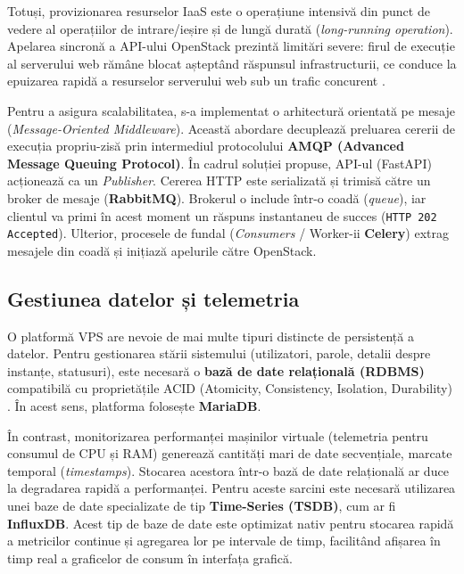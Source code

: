 Totuși, provizionarea resurselor IaaS este o operațiune intensivă din punct de vedere al operațiilor de intrare/ieșire și de lungă durată (\textit{long-running operation}). Apelarea sincronă a API-ului OpenStack prezintă limitări severe: firul de execuție al serverului web rămâne blocat așteptând răspunsul infrastructurii, ce conduce la epuizarea rapidă a resurselor serverului web sub un trafic concurent \cite{hohpe2004enterprise}.

Pentru a asigura scalabilitatea, s-a implementat o arhitectură orientată pe mesaje (\textit{Message-Oriented Middleware}). Această abordare decuplează preluarea cererii de execuția propriu-zisă prin intermediul protocolului \textbf{AMQP (Advanced Message Queuing Protocol)}. În cadrul soluției propuse, API-ul (FastAPI) acționează ca un \textit{Publisher}. Cererea HTTP este serializată și trimisă către un broker de mesaje (\textbf{RabbitMQ}). Brokerul o include într-o coadă (\textit{queue}), iar clientul va primi în acest moment un răspuns instantaneu de succes (\texttt{HTTP 202 Accepted}). Ulterior, procesele de fundal (\textit{Consumers} / Worker-ii \textbf{Celery}) extrag mesajele din coadă și inițiază apelurile către OpenStack.

\subsection{Gestiunea datelor și telemetria}

O platformă VPS are nevoie de mai multe tipuri distincte de persistență a datelor. Pentru gestionarea stării sistemului (utilizatori, parole, detalii despre instanțe, statusuri), este necesară o \textbf{bază de date relațională (RDBMS)} compatibilă cu proprietățile ACID (Atomicity, Consistency, Isolation, Durability) \cite{elmasri2015fundamentals}. În acest sens, platforma folosește \textbf{MariaDB}.

În contrast, monitorizarea performanței mașinilor virtuale (telemetria pentru consumul de CPU și RAM) generează cantități mari de date secvențiale, marcate temporal (\textit{timestamps}). Stocarea acestora într-o bază de date relațională ar duce la degradarea rapidă a performanței. Pentru aceste sarcini este necesară utilizarea unei baze de date specializate de tip \textbf{Time-Series (TSDB)}, cum ar fi \textbf{InfluxDB}. Acest tip de baze de date este optimizat nativ pentru stocarea rapidă a metricilor continue și agregarea lor pe intervale de timp, facilitând afișarea în timp real a graficelor de consum în interfața grafică.

